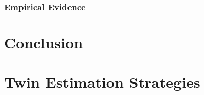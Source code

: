 \documentclass{article}[11pt,subeqn]
\begin{document}
\begin{spacing}{1.25}
\subsubsection{Empirical Evidence}

\section{Conclusion}

\newpage


\newpage
\appendix
\section{Twin Estimation Strategies}
\label{scn:litrev}

\vspace{19.2cm}	


\end{spacing}
\end{document}

